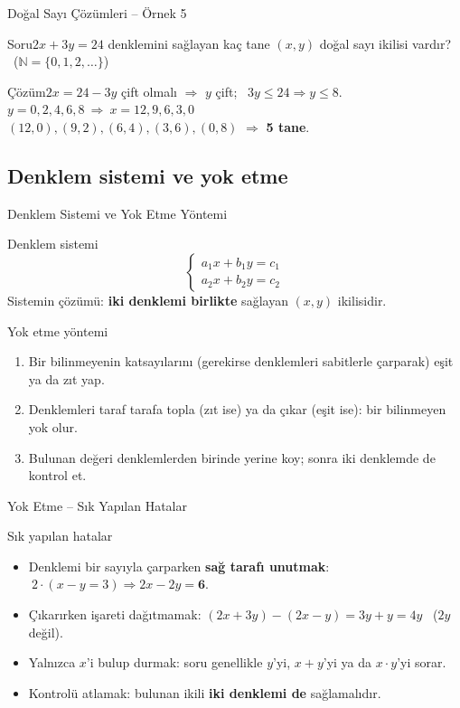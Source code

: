 \documentclass[aspectratio=169,11pt]{beamer}
\newcommand{\soru}[3]{%
\begin{frame}{#1}
  \begin{block}{Soru}\large #2\end{block}
  \pause
  \begin{exampleblock}{Çözüm}\large #3\end{exampleblock}
\end{frame}}
\begin{document}
\soru{Doğal Sayı Çözümleri -- Örnek 5}
{\(2x+3y=24\) denklemini sağlayan kaç tane \((x,y)\) doğal sayı ikilisi vardır? \ (\(\mathbb{N}=\{0,1,2,\dots\}\))}
{\(2x=24-3y\) çift olmalı \(\Rightarrow\) \(y\) çift; \ \(3y\le 24\Rightarrow y\le 8\).\\[3pt]
\(y=0,2,4,6,8\ \Rightarrow\ x=12,9,6,3,0\)\\[3pt]
\((12,0),(9,2),(6,4),(3,6),(0,8)\) \(\Rightarrow\) \textbf{5 tane}.}

\subsection{Denklem sistemi ve yok etme}
\begin{frame}{Denklem Sistemi ve Yok Etme Yöntemi}
\begin{block}{Denklem sistemi}
\[\begin{cases}a_1x+b_1y=c_1\\ a_2x+b_2y=c_2\end{cases}\]
Sistemin çözümü: \textbf{iki denklemi birlikte} sağlayan \((x,y)\) ikilisidir.
\end{block}
\begin{block}{Yok etme yöntemi}
\begin{enumerate}
\item Bir bilinmeyenin katsayılarını (gerekirse denklemleri sabitlerle çarparak) eşit ya da zıt yap.
\item Denklemleri taraf tarafa topla (zıt ise) ya da çıkar (eşit ise): bir bilinmeyen yok olur.
\item Bulunan değeri denklemlerden birinde yerine koy; sonra iki denklemde de kontrol et.
\end{enumerate}
\end{block}
\end{frame}

\begin{frame}{Yok Etme -- Sık Yapılan Hatalar}
\begin{alertblock}{Sık yapılan hatalar}
\begin{itemize}
\item Denklemi bir sayıyla çarparken \textbf{sağ tarafı unutmak}: \(\ 2\cdot(x-y=3)\Rightarrow 2x-2y=\mathbf{6}\).
\item Çıkarırken işareti dağıtmamak: \((2x+3y)-(2x-y)=3y+y=4y\) \ (\(2y\) değil).
\item Yalnızca \(x\)'i bulup durmak: soru genellikle \(y\)'yi, \(x+y\)'yi ya da \(x\cdot y\)'yi sorar.
\item Kontrolü atlamak: bulunan ikili \textbf{iki denklemi de} sağlamalıdır.
\end{itemize}
\end{alertblock}
\end{frame}
\end{document}
